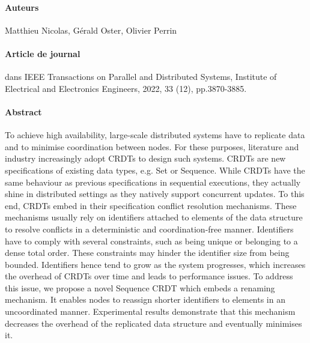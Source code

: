 \paragraph{Auteurs} Matthieu Nicolas, Gérald Oster, Olivier Perrin

\paragraph{Article de journal} dans IEEE Transactions on Parallel and Distributed Systems, Institute of Electrical and Electronics Engineers, 2022, 33 (12), pp.3870-3885.

\paragraph{Abstract}
To achieve high availability, large-scale distributed systems have to replicate data and to minimise coordination between nodes.
For these purposes, literature and industry increasingly adopt \acfp{CRDT} to design such systems.
\acp{CRDT} are new specifications of existing data types, e.g. Set or Sequence.
While \acp{CRDT} have the same behaviour as previous specifications in sequential executions, they actually shine in distributed settings as they natively support concurrent updates.
To this end, \acp{CRDT} embed in their specification conflict resolution mechanisms.
These mechanisms usually rely on identifiers attached to elements of the data structure to resolve conflicts in a deterministic and coordination-free manner.
Identifiers have to comply with several constraints, such as being unique or belonging to a dense total order.
These constraints may hinder the identifier size from being bounded.
Identifiers hence tend to grow as the system progresses, which increases the overhead of \acp{CRDT} over time and leads to performance issues.
To address this issue, we propose a novel Sequence \ac{CRDT} which embeds a renaming mechanism.
It enables nodes to reassign shorter identifiers to elements in an uncoordinated manner.
Experimental results demonstrate that this mechanism decreases the overhead of the replicated data structure and eventually minimises it.
